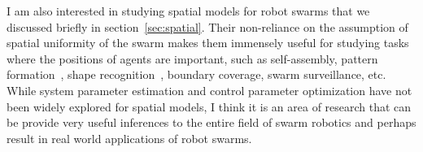 \documentclass[Main.tex]{subfiles}
\begin{document}
I am also interested in studying spatial models for robot swarms that we discussed briefly in section~\ref{sec:spatial}. Their non-reliance on the assumption of spatial uniformity of the swarm makes them immensely useful for studying tasks where the positions of agents are important, such as self-assembly, pattern formation~\cite{Hsieh2006}, shape recognition~\cite{Liu2011}, boundary coverage, swarm surveillance, etc. While system parameter estimation and control parameter optimization have not been widely explored for spatial models, I think it is an area of research that can be provide very useful inferences to the entire field of swarm robotics and perhaps result in real world applications of robot swarms.
\end{document}
